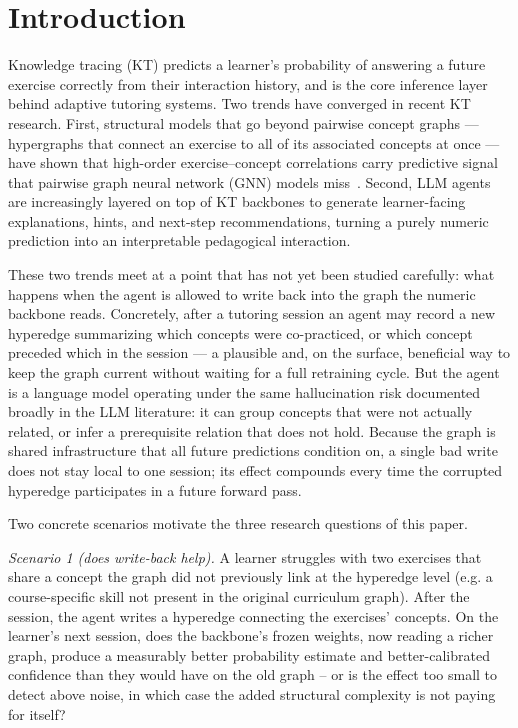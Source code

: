 \documentclass[review,12pt]{elsarticle}
\begin{document}
\section{Introduction}

Knowledge tracing (KT) predicts a learner's probability of answering a
future exercise correctly from their interaction history, and is the
core inference layer behind adaptive tutoring systems. Two trends have
converged in recent KT research. First, structural models that go beyond
pairwise concept graphs --- hypergraphs that connect an exercise to all
of its associated concepts at once --- have shown that high-order
exercise--concept correlations carry predictive signal that pairwise
graph neural network (GNN) models miss~\cite{lei2025hgkt,li2025dygas}.
Second, LLM agents are increasingly layered on top of KT backbones to
generate learner-facing explanations, hints, and next-step
recommendations, turning a purely numeric prediction into an
interpretable pedagogical interaction.

These two trends meet at a point that has not yet been studied
carefully: what happens when the agent is allowed to write back into the
graph the numeric backbone reads. Concretely, after a tutoring session
an agent may record a new hyperedge summarizing which concepts were
co-practiced, or which concept preceded which in the session --- a
plausible and, on the surface, beneficial way to keep the graph current
without waiting for a full retraining cycle. But the agent is a language
model operating under the same hallucination risk documented broadly in
the LLM literature: it can group concepts that were not actually related,
or infer a prerequisite relation that does not hold. Because the graph
is shared infrastructure that all future predictions condition on, a
single bad write does not stay local to one session; its effect
compounds every time the corrupted hyperedge participates in a future
forward pass.

Two concrete scenarios motivate the three research questions of this
paper.

\emph{Scenario 1 (does write-back help).} A learner struggles with two
exercises that share a concept the graph did not previously link at the
hyperedge level (e.g. a course-specific skill not present in the
original curriculum graph). After the session, the agent writes a
hyperedge connecting the exercises' concepts. On the learner's next
session, does the backbone's frozen weights, now reading a richer graph,
produce a measurably better probability estimate and better-calibrated
confidence than they would have on the old graph -- or is the effect too
small to detect above noise, in which case the added structural
complexity is not paying for itself?
\end{document}
